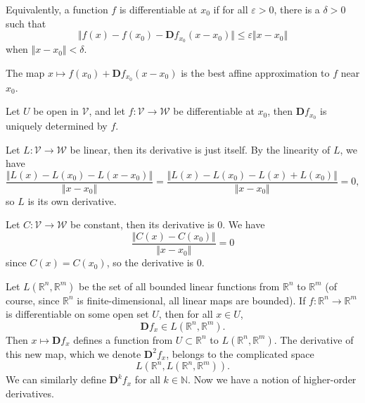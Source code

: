 \documentclass[twoside,10pt]{report}
\begin{document}
Equivalently, a function $f$ is differentiable at $x_0$ if for all $\varepsilon>0$, there is a $\delta>0$ such that
\[
	\Vert{f(x)-f(x_0)-\mathbf{D}f_{x_0}(x-x_0)}\Vert \leq \varepsilon\Vert{x-x_0}\Vert
\] when $\Vert{x-x_0}\Vert<\delta$.

\begin{note}[]
	The map $x \mapsto f(x_0) + \mathbf{D}f_{x_0}(x-x_0)$ is the best affine approximation to $f$ near $x_0$.
\end{note}

\begin{thrm}[]
Let $U$ be open in $\mathcal{V}$, and let $f:\mathcal{V} \to \mathcal{W}$ be differentiable at $x_0$, then $\mathbf{D}f_{x_0}$ is uniquely determined by $f$.
\end{thrm}

\begin{ex}
Let $L: \mathcal{V} \to \mathcal{W}$ be linear, then its derivative is just itself. By the linearity of $L$, we have
\[
	\frac{\Vert{L(x)-L(x_0)-L(x-x_0)}\Vert}{\Vert{x-x_0}\Vert} = \frac{\Vert{L(x)-L(x_0)-L(x)+L(x_0)}\Vert}{\Vert{x-x_0}\Vert} = 0,
\] so $L$ is its own derivative.
\end{ex}

\begin{ex}
Let $C:\mathcal{V}\to\mathcal{W}$ be constant, then its derivative is 0. We have
\[
	\frac{\Vert{C(x)-C(x_0)}\Vert}{\Vert{x-x_0}\Vert} = 0
\] since $C(x)=C(x_0)$, so the derivative is 0.
\end{ex}

Let $L(\mathbb{R}^n, \mathbb{R}^m)$ be the set of all bounded linear functions from $\mathbb{R}^n$ to $\mathbb{R}^m$ (of course, since $\mathbb{R}^n$ is finite-dimensional, all linear maps are bounded). If $f:\mathbb{R}^n \to \mathbb{R}^m$ is differentiable on some open set $U$, then for all $x \in U$,
\[
	\mathbf{D}f_x \in L(\mathbb{R}^n, \mathbb{R}^m).
\] Then $x \mapsto \mathbf{D}f_x$ defines a function from $U \subset \mathbb{R}^n$ to $L(\mathbb{R}^n, \mathbb{R}^m)$. The derivative of this new map, which we denote $\mathbf{D}^2f_x$, belongs to the complicated space
\[
	L(\mathbb{R}^n, L(\mathbb{R}^n, \mathbb{R}^m)).
\] We can similarly define $\mathbf{D}^k f_x$ for all $k \in \mathbb{N}$. Now we have a notion of higher-order derivatives.
\end{document}
